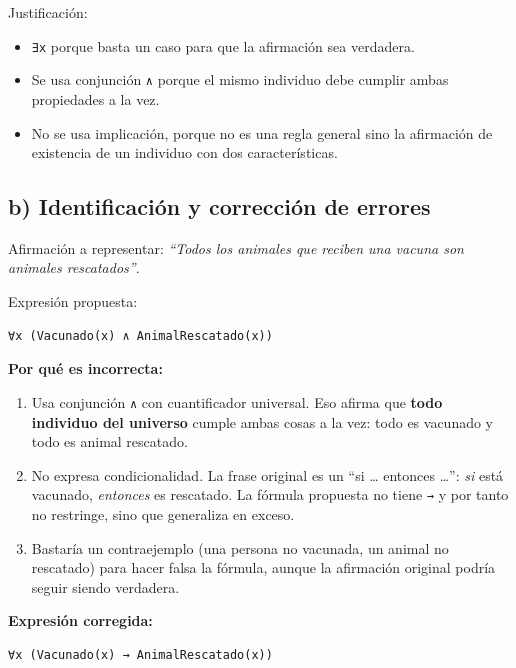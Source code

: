 Justificación:

\begin{itemize}
\tightlist
\item
  \texttt{∃x} porque basta un caso para que la afirmación sea verdadera.
\item
  Se usa conjunción \texttt{∧} porque el mismo individuo debe cumplir
  ambas propiedades a la vez.
\item
  No se usa implicación, porque no es una regla general sino la
  afirmación de existencia de un individuo con dos características.
\end{itemize}

\subsection{b) Identificación y corrección de
errores}\label{b-identificaciuxf3n-y-correcciuxf3n-de-errores}

Afirmación a representar: \emph{``Todos los animales que reciben una
vacuna son animales rescatados''}.

Expresión propuesta:

\begin{verbatim}
∀x (Vacunado(x) ∧ AnimalRescatado(x))
\end{verbatim}

\textbf{Por qué es incorrecta:}

\begin{enumerate}
\def\labelenumi{\arabic{enumi}.}
\tightlist
\item
  Usa conjunción \texttt{∧} con cuantificador universal. Eso afirma que
  \textbf{todo individuo del universo} cumple ambas cosas a la vez: todo
  es vacunado y todo es animal rescatado.
\item
  No expresa condicionalidad. La frase original es un ``si \ldots{}
  entonces \ldots'': \emph{si} está vacunado, \emph{entonces} es
  rescatado. La fórmula propuesta no tiene \texttt{→} y por tanto no
  restringe, sino que generaliza en exceso.
\item
  Bastaría un contraejemplo (una persona no vacunada, un animal no
  rescatado) para hacer falsa la fórmula, aunque la afirmación original
  podría seguir siendo verdadera.
\end{enumerate}

\textbf{Expresión corregida:}

\begin{verbatim}
∀x (Vacunado(x) → AnimalRescatado(x))
\end{verbatim}

